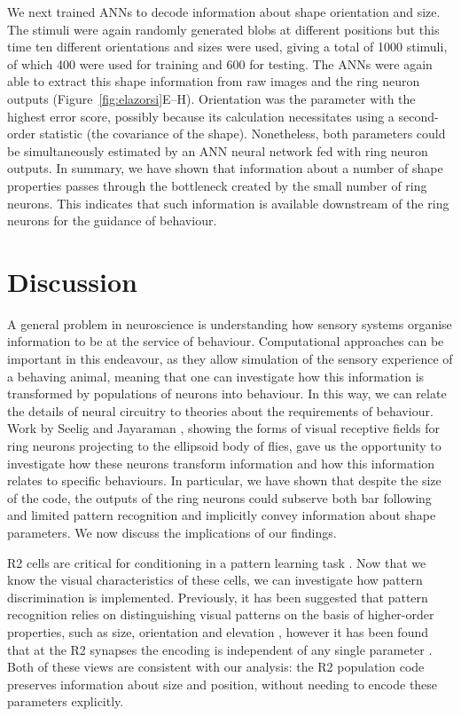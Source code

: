 We next trained ANNs to decode information about shape orientation and size. The stimuli were again randomly generated blobs at different positions but this time ten different orientations and sizes were used, giving a total of 1000 stimuli, of which 400 were used for training and 600 for testing. The ANNs were again able to extract this shape information from raw images and the ring neuron outputs (Figure~\ref{fig:elazorsi}E--H). Orientation was the parameter with the highest error score, possibly because its calculation necessitates using a second-order statistic (the covariance of the shape). Nonetheless, both parameters could be simultaneously estimated by an ANN neural network fed with ring neuron outputs. 
In summary, we have shown that information about a number of shape properties passes through the bottleneck created by the small number of ring neurons. This indicates that such information is available downstream of the ring neurons for the guidance of behaviour.

\section*{Discussion}
A general problem in neuroscience is understanding how sensory systems organise information to be at the service of behaviour. Computational approaches can be important in this endeavour, as they allow simulation of the sensory experience of a behaving animal, meaning that one can investigate how this information is transformed by populations of neurons into behaviour. In this way, we can relate the details of neural circuitry to theories about the requirements of behaviour. Work by Seelig and Jayaraman \cite{Seelig2013}, showing the forms of visual receptive fields for ring neurons projecting to the ellipsoid body of flies, gave us the opportunity to investigate how these neurons transform information and how this information relates to specific behaviours. In particular, we have shown that despite the size of the code, the outputs of the ring neurons could subserve both bar following and limited pattern recognition and implicitly convey information about shape parameters. We now discuss the implications of our findings.

R2 cells are critical for conditioning in a pattern learning task \cite{Pan2009}. Now that we know the visual characteristics of these cells, we can investigate how pattern discrimination is implemented. Previously, it has been suggested that pattern recognition relies on distinguishing visual patterns on the basis of higher-order properties, such as size, orientation and elevation \cite{Pan2009,Ernst1999}, however it has been found that at the R2 synapses the encoding is independent of any single parameter \cite{Liu2006}. Both of these views are consistent with our analysis: the R2 population code preserves information about size and position, without needing to encode these parameters explicitly.

